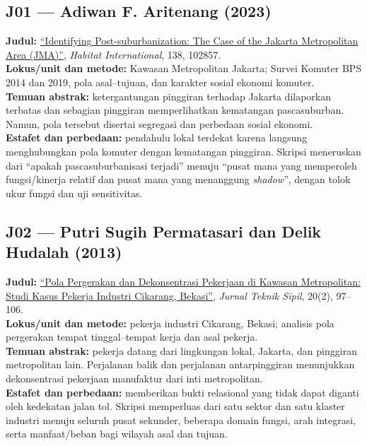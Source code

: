 \documentclass[
  indonesian,
  11pt,
  a4paper,
  oneside,
  openany]{report}
\begin{document}
\subsection{J01 --- Adiwan F. Aritenang
(2023)}\label{j01-adiwan-f.-aritenang-2023}

\textbf{Judul:}
\href{https://doi.org/10.1016/j.habitatint.2023.102857}{``Identifying
Post-suburbanization: The Case of the Jakarta Metropolitan Area
(JMA)''}, \emph{Habitat International}, 138, 102857.\\
\textbf{Lokus/unit dan metode:} Kawasan Metropolitan Jakarta; Survei
Komuter BPS 2014 dan 2019, pola asal--tujuan, dan karakter sosial
ekonomi komuter.\\
\textbf{Temuan abstrak:} ketergantungan pinggiran terhadap Jakarta
dilaporkan terbatas dan sebagian pinggiran memperlihatkan kematangan
pascasuburban. Namun, pola tersebut disertai segregasi dan perbedaan
sosial ekonomi.\\
\textbf{Estafet dan perbedaan:} pendahulu lokal terdekat karena langsung
menghubungkan pola komuter dengan kematangan pinggiran. Skripsi
meneruskan dari ``apakah pascasuburbanisasi terjadi'' menuju ``pusat
mana yang memperoleh fungsi/kinerja relatif dan pusat mana yang
menanggung \emph{shadow}'', dengan tolok ukur fungsi dan uji
sensitivitas.

\subsection{J02 --- Putri Sugih Permatasari dan Delik Hudalah
(2013)}\label{j02-putri-sugih-permatasari-dan-delik-hudalah-2013}

\textbf{Judul:} \href{https://doi.org/10.5614/jts.2013.20.2.3}{``Pola
Pergerakan dan Dekonsentrasi Pekerjaan di Kawasan Metropolitan: Studi
Kasus Pekerja Industri Cikarang, Bekasi''}, \emph{Jurnal Teknik Sipil},
20(2), 97--106.\\
\textbf{Lokus/unit dan metode:} pekerja industri Cikarang, Bekasi;
analisis pola pergerakan tempat tinggal--tempat kerja dan asal
pekerja.\\
\textbf{Temuan abstrak:} pekerja datang dari lingkungan lokal, Jakarta,
dan pinggiran metropolitan lain. Perjalanan balik dan perjalanan
antarpinggiran menunjukkan dekonsentrasi pekerjaan manufaktur dari inti
metropolitan.\\
\textbf{Estafet dan perbedaan:} memberikan bukti relasional yang tidak
dapat diganti oleh kedekatan jalan tol. Skripsi memperluas dari satu
sektor dan satu klaster industri menuju seluruh pusat sekunder, beberapa
domain fungsi, arah integrasi, serta manfaat/beban bagi wilayah asal dan
tujuan.
\end{document}
